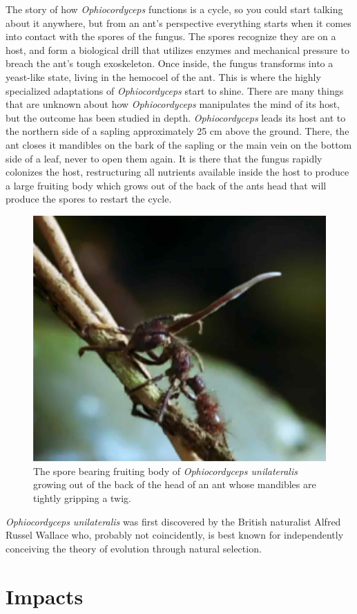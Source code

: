 \documentclass[twocolumn]{article}
\begin{document}
The story of how \textit{Ophiocordyceps} functions is a cycle, so you could start talking about it anywhere, but from an ant's perspective everything starts when it comes into contact with the spores of the fungus. The spores recognize they are on a host, and form a biological drill that utilizes enzymes and mechanical pressure to breach the ant's tough exoskeleton. Once inside, the fungus transforms into a yeast-like state, living in the hemocoel of the ant.\cite{cordy_infection} This is where the highly specialized adaptations of \textit{Ophiocordyceps} start to shine. There are many things that are unknown about how \textit{Ophiocordyceps} manipulates the mind of its host, but the outcome has been studied in depth. \textit{Ophiocordyceps} leads its host ant to the northern side of a sapling approximately 25 cm above the ground. There, the ant closes it mandibles on the bark of the sapling or the main vein on the bottom side of a leaf, never to open them again. It is there that the fungus rapidly colonizes the host, restructuring all nutrients available inside the host to produce a large fruiting body which grows out of the back of the ants head that will produce the spores to restart the cycle.\cite{life_of_dead_ant}

\begin{figure}[!ht]
    \centering
    \includegraphics[width=.4\textwidth]{images/cordyceps_ant.jpg}
    \caption{The spore bearing fruiting body of \textit{Ophiocordyceps unilateralis} growing out of the back of the head of an ant whose mandibles are tightly gripping a twig. }
    \label{fig:cordyceps_ant}
\end{figure}

\textit{Ophiocordyceps unilateralis} was first discovered by the British naturalist Alfred Russel Wallace who, probably not coincidently, is best known for independently conceiving the theory of evolution through natural selection. 


\section*{Impacts}
\end{document}
